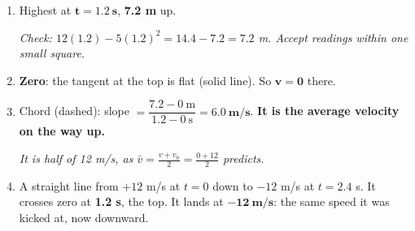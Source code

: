 \documentclass[12pt, twoside]{article}
\begin{document}
\begin{enumerate}[itemsep=0.5cm]
  \begin{enumerate}[itemsep=0.3cm]
    \item Highest at $\mathbf{t = 1.2~\textbf{s}}$, \textbf{7.2 m} up.

      \emph{Check: $12(1.2) - 5(1.2)^2 = 14.4 - 7.2 = 7.2$ m. Accept readings
      within one small square.}
    \item \textbf{Zero}: the tangent at the top is flat (solid line). So
      $\mathbf{v = 0}$ there.
    \item Chord (dashed): slope $= \dfrac{7.2 - 0~\text{m}}{1.2 - 0~\text{s}} =
      \mathbf{6.0~\textbf{m/s}}$. \textbf{It is the average velocity on the way up.}

      \emph{It is half of 12 m/s, as $\bar{v} = \frac{v + v_0}{2} = \frac{0 + 12}{2}$
      predicts.}
    \item A straight line from $+12$ m/s at $t = 0$ down to $-12$ m/s at
      $t = 2.4$ s. It crosses zero at \textbf{1.2 s}, the top. It lands at
      $\mathbf{-12~\textbf{m/s}}$: the same speed it was kicked at, now downward.
  \end{enumerate}

\end{enumerate}
\end{document}
